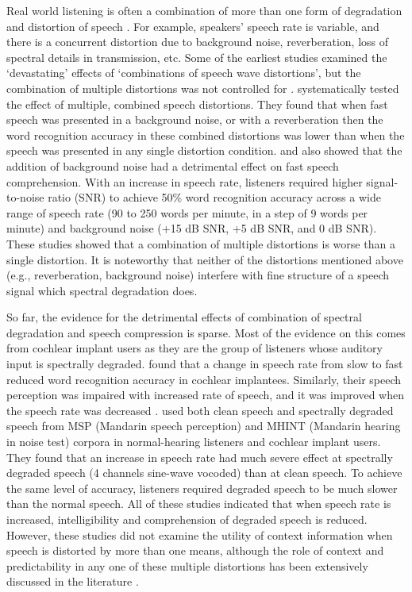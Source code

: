\documentclass[a4paper, nobind]{templates/ociamthesis}
\begin{document}
Real world listening is often a combination of more than one form of degradation and distortion of speech \autocites{Gordonsalant1995}[see also,][]{Cooke2014}.
For example, speakers' speech rate is variable, and there is a concurrent distortion due to background noise, reverberation, loss of spectral details in transmission, etc.
Some of the earliest studies examined the `devastating' effects of `combinations of speech wave distortions', but the combination of multiple distortions was not controlled for \autocite{Harris1960,Martin1956}.
\textcite{Gordonsalant1995} systematically tested the effect of multiple, combined speech distortions.
They found that when fast speech was presented in a background noise, or with a reverberation then the word recognition accuracy in these combined distortions was lower than when the speech was presented in any single distortion condition.
\textcite{Adams2009} and \textcite{Adams2012} also showed that the addition of background noise had a detrimental effect on fast speech comprehension.
With an increase in speech rate, listeners required higher signal-to-noise ratio (SNR) to achieve 50\% word recognition accuracy across a wide range of speech rate (90 to 250 words per minute, in a step of 9 words per minute) and background noise (+15 dB SNR, +5 dB SNR, and 0 dB SNR).
These studies showed that a combination of multiple distortions is worse than a single distortion.
It is noteworthy that neither of the distortions mentioned above (e.g., reverberation, background noise) interfere with fine structure of a speech signal which spectral degradation does.

So far, the evidence for the detrimental effects of combination of spectral degradation and speech compression is sparse. Most of the evidence on this comes from cochlear implant users \autocites[e.g.,][]{Li2011,Su2016} as they are the group of listeners whose auditory input is spectrally degraded.
\textcite{Iwasaki2002} found that a change in speech rate from slow to fast reduced word recognition accuracy in cochlear implantees.
Similarly, their speech perception was impaired with increased rate of speech, and it was improved when the speech rate was decreased \autocite[e.g.,][]{Dincer2018}.
\textcite{Meng2019} used both clean speech and spectrally degraded speech from MSP (Mandarin speech perception) and MHINT (Mandarin hearing in noise test) corpora in normal-hearing listeners and cochlear implant users.
They found that an increase in speech rate had much severe effect at spectrally degraded speech (4 channels sine-wave vocoded) than at clean speech.
To achieve the same level of accuracy, listeners required degraded speech to be much slower than the normal speech.
All of these studies indicated that when speech rate is increased, intelligibility and comprehension of degraded speech is reduced.
However, these studies did not examine the utility of context information when speech is distorted by more than one means, although the role of context and predictability in any one of these multiple distortions has been extensively discussed in the literature
\autocite{Aydelott2004,Sheldon2008a,Sheldon2008b,Obleser2010,Goy2013,Corps2020,Bhandari2021,Clark2021,vanOs2021}.
\end{document}
